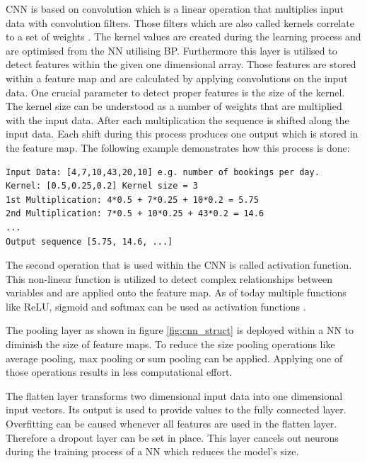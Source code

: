 CNN is based on convolution which is a linear operation that multiplies input data with convolution filters. Those filters which are also called kernels correlate to a set of weights \cite{cnn_vechicle}. The kernel values are created during the learning process and are optimised from the NN utilising BP. Furthermore this layer is utilised to detect features within the given one dimensional array. Those features are stored within a feature map and are calculated by applying convolutions on the input data. One crucial parameter to detect proper features is the size of the kernel. The kernel size can be understood as a number of weights that are multiplied with the input data. After each multiplication the sequence is shifted along the input data. Each shift during this process produces one output which is stored in the feature map. The following example demonstrates how this process is done:\cite{1d_cnn}
\begin{lstlisting}
Input Data: [4,7,10,43,20,10] e.g. number of bookings per day. 
Kernel: [0.5,0.25,0.2] Kernel size = 3
1st Multiplication: 4*0.5 + 7*0.25 + 10*0.2 = 5.75
2nd Multiplication: 7*0.5 + 10*0.25 + 43*0.2 = 14.6
...
Output sequence [5.75, 14.6, ...]
\end{lstlisting}
The second operation that is used within the CNN is called activation function. This non-linear function is utilized to detect complex relationships between variables and are applied onto the feature map. As of today multiple functions like ReLU, sigmoid and softmax can be used as activation functions \cite{cnn_basic3}.

The pooling layer as shown in figure \ref{fig:cnn_struct} is deployed within a NN to diminish the size of feature maps. To reduce the size pooling operations like average pooling, max pooling or sum pooling can be applied. Applying one of those operations results in less computational effort.\cite{cnn_basic}


The flatten layer transforms two dimensional input data into one dimensional input vectors. Its output is used to provide values to the fully connected layer. Overfitting can be caused whenever all features are used in the flatten layer. Therefore a dropout layer can be set in place.\cite{1d_cnn} This layer cancels out neurons during the training process of a NN which reduces the model's size. 


